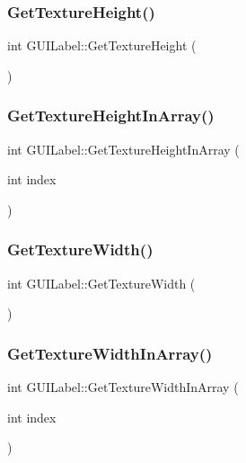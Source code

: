 \subsubsection{\texorpdfstring{Get\+Texture\+Height()}{GetTextureHeight()}}
{\footnotesize\ttfamily int G\+U\+I\+Label\+::\+Get\+Texture\+Height (\begin{DoxyParamCaption}{ }\end{DoxyParamCaption})}

\hypertarget{class_g_u_i_label_a4b45674c2f7151e38e7b811d21988536}{}\label{class_g_u_i_label_a4b45674c2f7151e38e7b811d21988536} 
\subsubsection{\texorpdfstring{Get\+Texture\+Height\+In\+Array()}{GetTextureHeightInArray()}}
{\footnotesize\ttfamily int G\+U\+I\+Label\+::\+Get\+Texture\+Height\+In\+Array (\begin{DoxyParamCaption}\item[{int}]{index }\end{DoxyParamCaption})}

\hypertarget{class_g_u_i_label_a9b7f39a13bcf32c518e7ecac79aab5aa}{}\label{class_g_u_i_label_a9b7f39a13bcf32c518e7ecac79aab5aa} 
\subsubsection{\texorpdfstring{Get\+Texture\+Width()}{GetTextureWidth()}}
{\footnotesize\ttfamily int G\+U\+I\+Label\+::\+Get\+Texture\+Width (\begin{DoxyParamCaption}{ }\end{DoxyParamCaption})}

\hypertarget{class_g_u_i_label_a30459bcd523640b11d278deb5c2824aa}{}\label{class_g_u_i_label_a30459bcd523640b11d278deb5c2824aa} 
\subsubsection{\texorpdfstring{Get\+Texture\+Width\+In\+Array()}{GetTextureWidthInArray()}}
{\footnotesize\ttfamily int G\+U\+I\+Label\+::\+Get\+Texture\+Width\+In\+Array (\begin{DoxyParamCaption}\item[{int}]{index }\end{DoxyParamCaption})}

